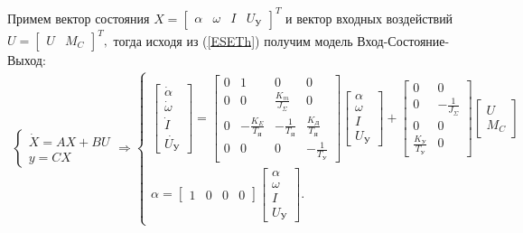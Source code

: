 \documentclass[a4paper,12pt]{article} %
\begin{document}
Примем вектор состояния
$
	X =
	\begin{bmatrix}
		\alpha & \omega & I & U_\text{У}
	\end{bmatrix}^T
$
и вектор входных воздействий
$
	U =
	\begin{bmatrix}
		U & M_C
	\end{bmatrix}^T,
$
тогда исходя из (\ref{ESETh}) получим модель Вход-Состояние-Выход:
\begin{align}
	\begin{cases}
		\dot{X} = AX + BU\\
		y = CX
	\end{cases} \Rightarrow
	\begin{cases}
		\begin{bmatrix}
			\dot{\alpha}\\
			\dot{\omega}\\
			\dot{I}\\
			\dot{U_\text{У}}
		\end{bmatrix} =
		\begin{bmatrix}
			0 & 1 & 0 & 0\\
			0 & 0 & \displaystyle{\frac{K_m}{J_\Sigma}} & 0\\
			0 & -\displaystyle{\frac{K_E}{T_\text{Я}}} & -\displaystyle{\frac{1}{T_\text{Я}}} & \displaystyle{\frac{K_\text{Д}}{T_\text{Я}}}\\
			0 & 0 & 0 & -\displaystyle{\frac{1}{T_\text{У}}}
		\end{bmatrix}
		\begin{bmatrix}
			\alpha\\
			\omega\\
			I\\
			U_\text{У}
		\end{bmatrix}
		+
		\begin{bmatrix}
			0 & 0\\
			0 & -\displaystyle{\frac{1}{J_\Sigma}}\\
			0 & 0\\
			\displaystyle{\frac{K_\text{У}}{T_\text{У}}} & 0
		\end{bmatrix}
		\begin{bmatrix}
			U\\
			M_C
		\end{bmatrix}\\
		\alpha = 
		\begin{bmatrix}
			1 & 0 & 0 & 0
		\end{bmatrix}
		\begin{bmatrix}
			\alpha\\
			\omega\\
			I\\
			U_\text{У}
		\end{bmatrix}.
	\end{cases}
	\label{ESEFull}
\end{align}
	
\end{document}
